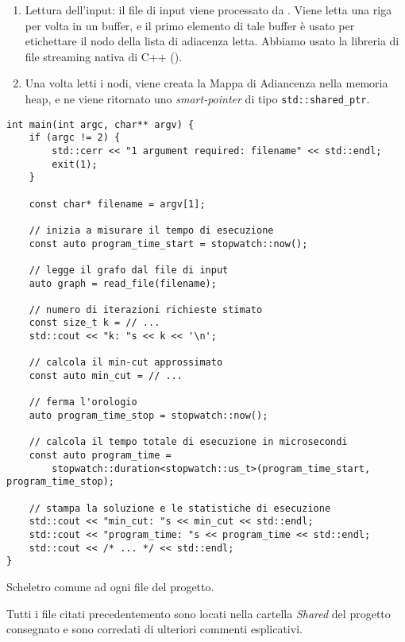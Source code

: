 \begin{enumerate}
    \item Lettura dell'input: il file di input viene processato
      da . Viene letta una riga per volta in
      un buffer, e il primo elemento di tale buffer è usato per
      etichettare il nodo della lista di adiacenza letta. Abbiamo usato la libreria di file streaming nativa di
    C++ ().

    \item Una volta letti i nodi, viene creata la Mappa di Adiancenza
      nella memoria heap, e ne viene ritornato uno
      \textit{smart-pointer} di tipo
      \texttt{std::shared_ptr}.
\end{enumerate}

\begin{listing}[!ht]
\begin{verbatim}
int main(int argc, char** argv) {
    if (argc != 2) {
        std::cerr << "1 argument required: filename" << std::endl;
        exit(1);
    }

    const char* filename = argv[1];

    // inizia a misurare il tempo di esecuzione
    const auto program_time_start = stopwatch::now();

    // legge il grafo dal file di input
    auto graph = read_file(filename);

    // numero di iterazioni richieste stimato
    const size_t k = // ...
    std::cout << "k: "s << k << '\n';

    // calcola il min-cut approssimato
    const auto min_cut = // ...

    // ferma l'orologio
    auto program_time_stop = stopwatch::now();

    // calcola il tempo totale di esecuzione in microsecondi
    const auto program_time =
        stopwatch::duration<stopwatch::us_t>(program_time_start, program_time_stop);

    // stampa la soluzione e le statistiche di esecuzione
    std::cout << "min_cut: "s << min_cut << std::endl;
    std::cout << "program_time: "s << program_time << std::endl;
    std::cout << /* ... */ << std::endl;
}
\end{verbatim}
\caption{Scheletro comune ad ogni file  del progetto.}
\label{listing:main-cpp}
\end{listing}

\noindent Tutti i file citati precedentemento sono locati nella
cartella \textit{Shared} del progetto consegnato e sono corredati di
ulteriori commenti esplicativi.

